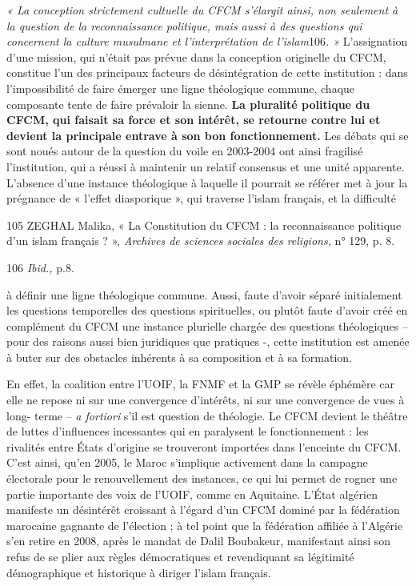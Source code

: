 \emph{« La conception strictement cultuelle du CFCM s'élargit ainsi, non
seulement à la question de la reconnaissance politique, mais aussi à des
questions qui concernent la culture musulmane et l'interprétation de
l'islam}106\emph{. »} L'assignation d'une mission, qui n'était pas
prévue dans la conception originelle du CFCM, constitue l'un des
principaux facteurs de désintégration de cette institution : dans
l'impossibilité de faire émerger une ligne théologique commune, chaque
composante tente de faire prévaloir la sienne. \textbf{La pluralité
politique du CFCM, qui faisait sa force et son intérêt, se retourne
contre lui et devient la principale entrave à son bon fonctionnement.}
Les débats qui se sont noués autour de la question du voile en 2003-2004
ont ainsi fragilisé l'institution, qui a réussi à maintenir un relatif
consensus et une unité apparente. L'absence d'une instance théologique à
laquelle il pourrait se référer met à jour la prégnance de « l'effet
diasporique », qui traverse l'islam français, et la difficulté

105 ZEGHAL Malika, « La Constitution du CFCM : la reconnaissance
politique d'un islam français ? », \emph{Archives de sciences sociales
des religions,} n° 129, p. 8.

106 \emph{Ibid.,} p.8.



à définir une ligne théologique commune. Aussi, faute d'avoir séparé
initialement les questions temporelles des questions spirituelles, ou
plutôt faute d'avoir créé en complément du CFCM une instance plurielle
chargée des questions théologiques -- pour des raisons aussi bien
juridiques que pratiques -, cette institution est amenée à buter sur des
obstacles inhérents à sa composition et à sa formation.

En effet, la coalition entre l'UOIF, la FNMF et la GMP se révèle
éphémère car elle ne repose ni sur une convergence d'intérêts, ni sur
une convergence de vues à long- terme -- \emph{a fortiori} s'il est
question de théologie. Le CFCM devient le théâtre de luttes d'influences
incessantes qui en paralysent le fonctionnement : les rivalités entre
États d'origine se trouveront importées dans l'enceinte du CFCM. C'est
ainsi, qu'en 2005, le Maroc s'implique activement dans la campagne
électorale pour le renouvellement des instances, ce qui lui permet de
rogner une partie importante des voix de l'UOIF, comme en Aquitaine.
L'État algérien manifeste un désintérêt croissant à l'égard d'un CFCM
dominé par la fédération marocaine gagnante de l'élection ; à tel point
que la fédération affiliée à l'Algérie s'en retire en 2008, après le
mandat de Dalil Boubakeur, manifestant ainsi son refus de se plier aux
règles démocratiques et revendiquant sa légitimité démographique et
historique à diriger l'islam français.



